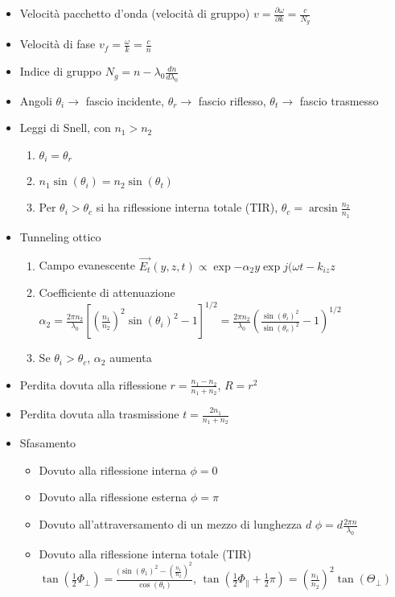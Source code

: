 \documentclass{article}
\begin{document}
\begin{itemize}
	\item Velocità pacchetto d'onda (velocità di gruppo) \( v = \frac{\partial \omega}{\partial k} = \frac{c}{N_g} \)
	\item Velocità di fase \( v_f = \frac{\omega}{k} = \frac{c}{n}  \)
	\item Indice di gruppo \( N_g = n - \lambda_0 \frac{dn}{d\lambda_0} \)
	\item Angoli \( \theta_i \rightarrow \) fascio incidente, \( \theta_r \rightarrow \) fascio riflesso, \( \theta_t \rightarrow \) fascio trasmesso    
	\item Leggi di Snell, con \( n_1 > n_2 \)
	\begin{enumerate}
		\item \( \theta_i = \theta_r \)
		\item \( n_1 \sin(\theta_i) = n_2 \sin(\theta_t) \)
		\item Per \( \theta_i > \theta_c \) si ha riflessione interna totale (TIR), \( \theta_c = \arcsin\frac{n_2}{n_1} \)
	\end{enumerate}
	\item Tunneling ottico 
	\begin{enumerate}
		\item Campo evanescente \( \vec{E_t}(y, z, t) \propto \exp{-\alpha_2 y} \exp{j (\omega t - k_{iz} z} \)
		\item Coefficiente di attenuazione \( \alpha_2 = \frac{2 \pi n_2}{\lambda_0} [(\frac{n_1}{n_2})^2 \sin(\theta_i)^2 - 1] ^ {1/2} = \frac{2 \pi n_2}{\lambda_0} (\frac{\sin(\theta_i)^2}{\sin(\theta_c)^2} - 1) ^ {1/2} \)
		\item Se \( \theta_i > \theta_c\), \(\alpha_2 \) aumenta
	\end{enumerate}
	\item Perdita dovuta alla riflessione \(r = \frac{n_1-n_2}{n_1+n_2} \), \( R = r^2 \)
	\item Perdita dovuta alla trasmissione \( t = \frac{2n_1}{n_1 + n_2} \)
	\item Sfasamento
	\begin{itemize}
		\item Dovuto alla riflessione interna \( \phi = 0 \)
		\item Dovuto alla riflessione esterna \( \phi = \pi \)
		\item Dovuto all'attraversamento di un mezzo di lunghezza \( d \) \( \phi = d \frac{2 \pi n}{\lambda_0} \)
		\item Dovuto alla riflessione interna totale (TIR) \( \tan(\frac{1}{2} \Phi_\perp) = \frac{(\sin(\theta_1)^2 - ( \frac{n_1}{n_2})^2}{\cos(\theta_i)} \), \( \tan(\frac{1}{2} \Phi_\parallel + \frac{1}{2} \pi) = (\frac{n_1}{n_2})^2 \tan(\Theta_\perp) \) 

\end{itemize}
\end{itemize}
\end{document}
